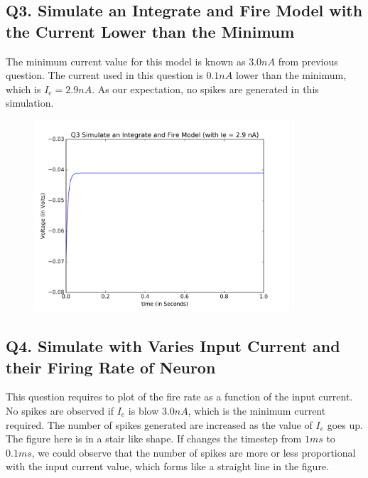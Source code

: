 \documentclass[DIV=calc, paper=a4, fontsize=12pt, twocolumn]{article}	 %
\begin{document}
	\subsection*{Q3. Simulate an Integrate and Fire Model with the Current Lower than the Minimum}
	The minimum current value for this model is known as $3.0 nA$ from previous question. The current used in this question is $0.1 nA$ lower than the minimum, which is $I_e = 2.9 nA$. As our expectation, no spikes are generated in this simulation.
		\begin{figure}[H]
			\includegraphics*[width = 9.5cm]{Q3}
		\end{figure}
	\subsection*{Q4. Simulate with Varies Input Current and their Firing Rate of Neuron}
	This question requires to plot of the fire rate as a function of the input current. No spikes are observed if $I_e$ is blow $3.0 nA$, which is the minimum current required. The number of spikes generated are increased as the value of $I_e$ goes up. The figure here is in a stair like shape. If changes the timestep from $1 ms$ to $0.1 ms$, we could observe that the number of spikes are more or less proportional with the input current value, which forms like a straight line in the figure.
\end{document}
